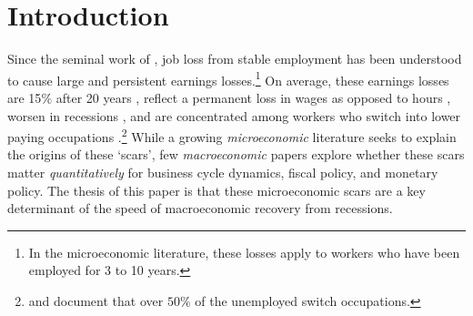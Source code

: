 
\section{Introduction}
Since the seminal work of \cite{Jacobson1993}, job loss from stable employment has been understood to cause large and persistent earnings losses.\footnote{In the microeconomic literature, these losses apply to workers who have been employed for 3 to 10 years.} On average, these earnings losses are 15$\%$ after 20 years \citep[e.g.][]{DavisVonWachter2011, Huckfeldt2022}, reflect a permanent loss in wages as opposed to hours \citep[e.g.][]{Moore2019, Lachowska2020,Huckfeldt2022}, worsen in recessions \citep{DavisVonWachter2011, Schmieder2023}, and are concentrated among workers who switch into lower paying occupations \citep{Huckfeldt2022}.\footnote{\cite{Huckfeldt2022} and \cite{Fujita2017} document that over $50\%$ of the unemployed switch occupations. } While a growing \textit{microeconomic} literature seeks to explain the origins of these `scars', few \textit{macroeconomic} papers explore whether these scars matter \textit{quantitatively} for business cycle dynamics, fiscal policy, and monetary policy. The thesis of this paper is that these microeconomic scars are a key determinant of the speed of macroeconomic recovery from recessions.


